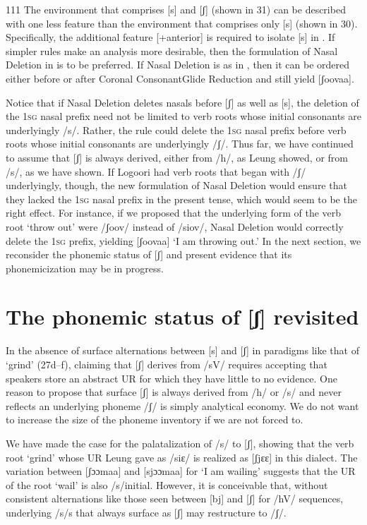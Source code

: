 \documentclass[output=paper]{langsci/langscibook}
\begin{document}
\begin{tabular}{111}
The environment that comprises [s] and [ʃ] (shown in 31) can be described with one less feature than the environment that comprises only [s] (shown in 30). Specifically, the additional feature [+anterior] is required to isolate [s] in . If simpler rules make an analysis more desirable, then the formulation of Nasal Deletion in  is to be preferred. If Nasal Deletion is as in , then it can be ordered either before or after Coronal ConsonantGlide Reduction and still yield [ʃoovaa]. 

Notice that if Nasal Deletion deletes nasals before [ʃ] as well as [s], the deletion of the 1\textsc{sg} nasal prefix need not be limited to verb roots whose initial consonants are underlyingly /s/. Rather, the rule could delete the 1\textsc{sg} nasal prefix before verb roots whose initial consonants are underlyingly /ʃ/. Thus far, we have continued to assume that [ʃ] is always derived, either from /h/, as Leung showed, or from /s/, as we have shown. If Logoori had verb roots that began with /ʃ/ underlyingly, though, the new formulation of Nasal Deletion would ensure that they lacked the 1\textsc{sg} nasal prefix in the present tense, which would seem to be the right effect. For instance, if we proposed that the underlying form of the verb root ‘throw out’ were /ʃoov/ instead of /siov/, Nasal Deletion would correctly delete the 1\textsc{sg} prefix, yielding [ʃoovaa] ‘I am throwing out.’ In the next section, we reconsider the phonemic status of [ʃ] and present evidence that its phonemicization may be in progress.

\section{The phonemic status of [ʃ] revisited}

In the absence of surface alternations between [s] and [ʃ] in paradigms like that of ‘grind’ (27d–f), claiming that [ʃ] derives from /sV/ requires accepting that speakers store an abstract UR for which they have little to no evidence. One reason to propose that surface [ʃ] is always derived from /h/ or /s/ and never reflects an underlying phoneme /ʃ/ is simply analytical economy. We do not want to increase the size of the phoneme inventory if we are not forced to.

We have made the case for the palatalization of /s/ to [ʃ], showing that the verb root ‘grind’ whose UR Leung gave as /siɛ/ is realized as [ʃjɛɛ] in this dialect. The variation between [ʃɔɔmaa] and [sjɔɔmaa] for ‘I am wailing’ suggests that the UR of the root ‘wail’ is also /s/initial. However, it is conceivable that, without consistent alternations like those seen between [bj] and [ʃ] for /hV/ sequences, underlying /s/s that always surface as [ʃ] may restructure to /ʃ/. 


\end{tabular}
\end{document}

